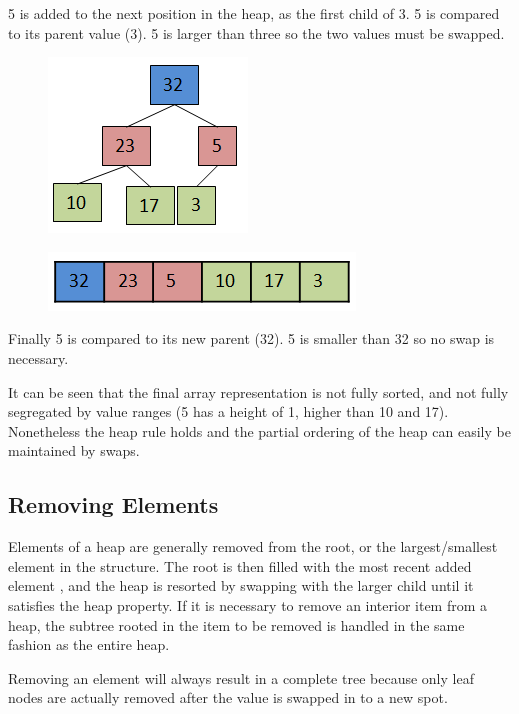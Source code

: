 5 is added to the next position in the heap, as the first child of 3.    5 is compared to its parent value (3).  5 is larger than three so the two values must be swapped.

\begin{figure}[H]
\centering
\includegraphics{pictures/heap10.png}
\label{fig:heap10}
\end{figure}

\begin{figure}[H]
\centering
\includegraphics{pictures/heap10a.png}
\label{fig:heap10a}
\end{figure}

Finally 5 is compared to its new parent (32).  5 is smaller than 32 so no swap is necessary.

It can be seen that the final array representation is not fully sorted, and not fully segregated by value ranges (5 has a height of 1, higher than 10 and 17).   Nonetheless the heap rule holds and the partial ordering of the heap can easily be maintained by swaps.



\subsection{Removing Elements}

Elements of a heap are generally removed from the root, or the largest/smallest element in the structure. The root is then filled with the most recent added element , and the heap is resorted by swapping with the larger child until it satisfies the heap property.   If it is necessary to remove an interior item from a heap,  the subtree rooted in the item to be removed is handled in the same fashion as the entire heap.


Removing an element will always result in a complete tree because only leaf nodes are actually removed after the value is swapped in to a new spot.

